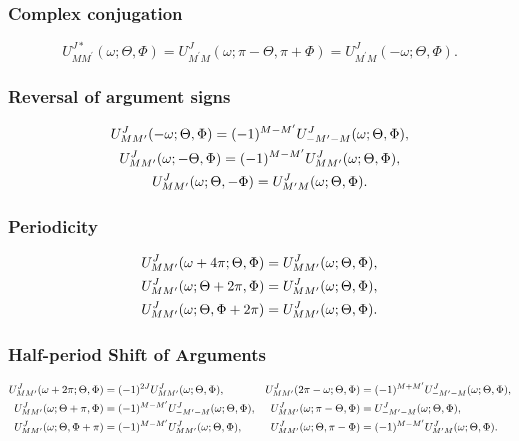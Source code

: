 \subsubsection{ Complex conjugation}
\begin{equation}
U_{M M^{\prime}}^{J *}(\omega ; \Theta, \Phi)=U_{M^{\prime} M}^{J}(\omega ; \pi-\Theta, \pi+\Phi)=U_{M^{\prime} M}^{J}(-\omega ; \Theta, \Phi) \label{eq:4:5:18}.
\end{equation}
\subsubsection{ Reversal of argument signs}
\begin{gather}
U_{M M^{\prime}}^{J}(-\omega ; \Theta, \Phi)=(-1)^{M-M^{\prime}} U_{-M^{\prime}-M}^{J}(\omega ; \Theta, \Phi)  ,\notag\\
U_{M M^{\prime}}^{J}(\omega ;-\Theta, \Phi)=(-1)^{M-M^{\prime}} U_{M M^{\prime}}^{J}(\omega ; \Theta, \Phi) , \label{eq:4:5:19}\\
U_{M M^{\prime}}^{J}(\omega ; \Theta,-\Phi)=U_{M^{\prime} M}^{J}(\omega ; \Theta, \Phi) .\notag
\end{gather}
\subsubsection{ Periodicity}
\begin{gather}
U_{M M^{\prime}}^{J}(\omega+4 \pi ; \Theta, \Phi)=U_{M M^{\prime}}^{J}(\omega ; \Theta, \Phi) , \notag\\
U_{M M^{\prime}}^{J}(\omega ; \Theta+2 \pi, \Phi)=U_{M M^{\prime}}^{J}(\omega ; \Theta, \Phi)  ,\label{eq:4:5:20}\\
U_{M M^{\prime}}^{J}(\omega ; \Theta, \Phi+2 \pi)=U_{M M^{\prime}}^{J}(\omega ; \Theta, \Phi) .\notag
\end{gather}
\subsubsection{Half-period Shift of Arguments}
\begin{align}
U_{M M^{\prime}}^{J}(\omega+2 \pi ; \Theta, \Phi) & =(-1)^{2 J} U_{M M^{\prime}}^{J}(\omega ; \Theta, \Phi), & U_{M M^{\prime}}^{J}(2 \pi-\omega ; \Theta, \Phi) & =(-1)^{M+M^{\prime}} U_{-M^{\prime}-M}^{J}(\omega ; \Theta, \Phi) , \notag\\
U_{M M^{\prime}}^{J}(\omega ; \Theta+\pi, \Phi) & =(-1)^{M-M^{\prime}} U_{-M^{\prime}-M}^{J}(\omega ; \Theta, \Phi), & U_{M M^{\prime}}^{J}(\omega ; \pi-\Theta, \Phi) & =U_{-M^{\prime}-M}^{J}(\omega ; \Theta, \Phi)  ,\notag\\
U_{M M^{\prime}}^{J}(\omega ; \Theta, \Phi+\pi) & =(-1)^{M-M^{\prime}} U_{M M^{\prime}}^{J}(\omega ; \Theta, \Phi), & U_{M M^{\prime}}^{J}(\omega ; \Theta, \pi-\Phi) & =(-1)^{M-M^{\prime}} U_{M^{\prime} M}^{J}(\omega ; \Theta, \Phi). \label{eq:4:5:21}
\end{align}
